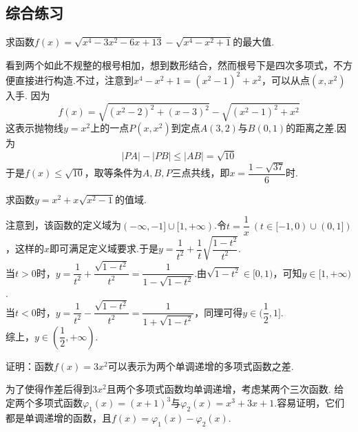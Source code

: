 \documentclass[cn,hazy,black,10pt,normal]{elegantnote}
\newenvironment{guess}{
  \color{guess}}{\newline \color{black}}
\begin{document}
\subsection{综合练习}

\begin{problem} %
	求函数$f(x)=\sqrt{x^4-3x^2-6x+13} - \sqrt{x^4 - x^2 + 1}$的最大值.
\end{problem}
\begin{solution}
	\begin{guess}
		看到两个如此不规整的根号相加，想到数形结合，然而根号下是四次多项式，不方便直接进行构造.不过，注意到$x^4-x^2+1 = (x^2-1)^2 + x^2$，可以从点$(x,x^2)$入手.
	\end{guess}
	因为$$f(x) = \sqrt{(x^2-2)^2 + (x-3)^2} - \sqrt{(x^2-1)^2 + x^2}$$
	这表示抛物线$y=x^2$上的一点$P(x,x^2)$到定点$A(3,2)$与$B(0,1)$的距离之差.因为$$|PA| - |PB| \leq |AB| = \sqrt{10}$$
	于是$f(x) \leq \sqrt{10}$，取等条件为$A,B,P$三点共线，即$x=\dfrac{1-\sqrt{37}}{6}$时.
\end{solution}

\begin{problem} %
	求函数$y=x^2+x\sqrt{x^2-1}$的值域.
\end{problem}
\begin{solution}
	注意到，该函数的定义域为$(-\infty ,-1] \cup [1,+\infty )$.令$t=\dfrac{1}{x}~(t \in [-1,0) \cup (0,1])$，这样的$x$即可满足定义域要求.于是$y=\dfrac{1}{t^2}+\dfrac{1}{t}\sqrt{\dfrac{1-t^2}{t^2}}$. \\
	当$t>0$时，$y=\dfrac{1}{t^2}+\dfrac{\sqrt{1-t^2}}{t^2} = \dfrac{1}{1-\sqrt{1-t^2}}$.由$\sqrt{1-t^2} \in [0,1)$，可知$y \in [1,+\infty)$. \\
	当$t<0$时，$y=\dfrac{1}{t^2}-\dfrac{\sqrt{1-t^2}}{t^2} = \dfrac{1}{1+\sqrt{1-t^2}}$，同理可得$y \in (\dfrac{1}{2},1]$. \\
	综上，$y \in (\dfrac{1}{2},+\infty)$.
\end{solution}

\begin{problem} %
	证明：函数$f(x)=3x^2$可以表示为两个单调递增的多项式函数之差.
\end{problem}
\begin{solution}
	\begin{guess}
		为了使得作差后得到$3x^2$且两个多项式函数均单调递增，考虑某两个三次函数.
	\end{guess}
	给定两个多项式函数$\varphi _1(x)=(x+1)^3$与$\varphi _2(x)=x^3+3x+1$.容易证明，它们都是单调递增的函数，且$f(x)=\varphi _1(x) - \varphi _2(x)$.
\end{solution}
\end{document}
